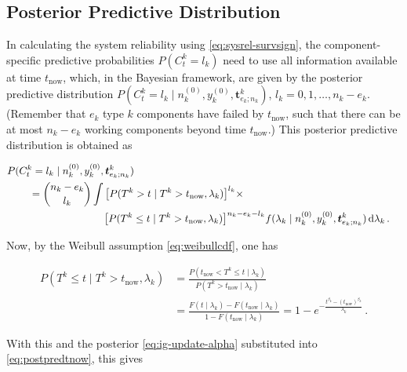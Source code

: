 \documentclass[Journal,letterpaper]{ascelike-new}
\newcommand{\dd}{\,\mathrm{d}}
\renewcommand{\vec}[1]{{\bm#1}}
\newcommand{\uz}{^{(0)}} %
\def\ykz{y\uz_k}
\def\nkz{n\uz_k}
\def\tnow{t_\text{now}}
\begin{document}
\subsection{Posterior Predictive Distribution}
\label{sec:postpred}

In calculating the system reliability using \eqref{eq:sysrel-survsign},
the component-specific predictive probabilities $P(C^k_t = l_k)$
need to use all information available at time $\tnow$,
which, in the Bayesian framework,
are given by the posterior predictive distribution 
$P(C^k_t = l_k\mid\nkz,\ykz, \vec{t}^k_{e_k;n_k})$, $l_k = 0, 1, \ldots, n_k-e_k$. %
(Remember that $e_k$ type $k$ components have failed by $\tnow$,
such that there can be at most $n_k-e_k$ working components beyond time $\tnow$.)
This posterior predictive distribution is obtained as
\begin{linenomath*}
\begin{align}
\lefteqn{%
P(C^k_t = l_k\mid\nkz,\ykz, \vec{t}^k_{e_k;n_k})}\hspace*{5ex} \nonumber\\  %
 &= { n_k - e_k \choose l_k} \int \big[P(T^k >    t \mid T^k > \tnow, \lambda_k)\big]^{l_k} \times \nonumber\\ & \hspace*{17ex}
                                  \big[P(T^k \leq t \mid T^k > \tnow, \lambda_k)\big]^{n_k - e_k - l_k}
    f(\lambda_k\mid\nkz,\ykz,\vec{t}^k_{e_k;n_k}) \dd \lambda_k\,.
\label{eq:postpredtnow}
\end{align}
\end{linenomath*}
%
Now, by the Weibull assumption \eqref{eq:weibullcdf}, one has
\begin{linenomath*}
\begin{align}
P(T^k \leq t \mid T^k > \tnow, \lambda_k)
 &= \frac{P(\tnow < T^k \leq t \mid\lambda_k)}{P(T^k > \tnow \mid \lambda_k)} \nonumber\\
 &= \frac{F(t\mid\lambda_k) - F(\tnow\mid\lambda_k)}{1-F(\tnow\mid\lambda_k)} 
  = 1 - e^{-\frac{t^{\beta_k} - (\tnow)^{\beta_k}}{\lambda_k}}\,.
\end{align}
\end{linenomath*}
%
With this and the posterior \eqref{eq:ig-update-alpha} substituted into \eqref{eq:postpredtnow}, this gives
\end{document}
